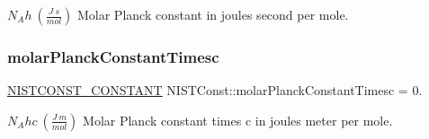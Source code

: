 $N_A h \ (\frac{J\ s}{mol})$ Molar Planck constant in joules second per mole. \mbox{\label{group___n_i_s_t_const-_molar_planck_constant_ga79708a6d196bdd250c5e965eb857a786}} 
\subsubsection{\texorpdfstring{molar\+Planck\+Constant\+Timesc}{molarPlanckConstantTimesc}}
{\footnotesize\ttfamily \mbox{\hyperlink{_n_i_s_t_const_8hpp_a2b0fc1d7452373f816175dd86ce26729}{N\+I\+S\+T\+C\+O\+N\+S\+T\+\_\+\+C\+O\+N\+S\+T\+A\+NT}} N\+I\+S\+T\+Const\+::molar\+Planck\+Constant\+Timesc = 0.}

$N_A hc \ (\frac{J\ m}{mol})$ Molar Planck constant times c in joules meter per mole. 